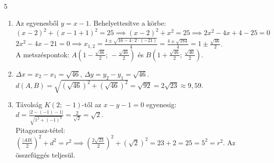 \documentclass[11pt,a4paper]{article}
\begin{document}
\begin{megoldasbox}{5}
\begin{enumerate}
  \item Az egyenesből $y = x - 1$. Behelyettesítve a körbe:\\
        $(x - 2)^2 + (x - 1 + 1)^2 = 25 \implies (x - 2)^2 + x^2 = 25 \implies 2x^2 - 4x + 4 - 25 = 0$\\
        $2x^2 - 4x - 21 = 0 \implies x_{1,2} = \frac{4 \pm \sqrt{16 - 4 \cdot 2 \cdot (-21)}}{4} = \frac{4 \pm \sqrt{184}}{4} = 1 \pm \frac{\sqrt{46}}{2}$.\\
        A metszéspontok: $A\left(1 - \frac{\sqrt{46}}{2};\, -\frac{\sqrt{46}}{2}\right)$ és $B\left(1 + \frac{\sqrt{46}}{2};\, \frac{\sqrt{46}}{2}\right)$.
  \item $\Delta x = x_2 - x_1 = \sqrt{46}$, $\Delta y = y_2 - y_1 = \sqrt{46}$.\\
        $d(A, B) = \sqrt{(\sqrt{46})^2 + (\sqrt{46})^2} = \sqrt{92} = 2\sqrt{23} \approx 9{,}59$.
  \item Távolság $K(2;\, -1)$-től az $x - y - 1 = 0$ egyenesig:\\
        $d = \frac{|2 - (-1) - 1|}{\sqrt{1^2 + (-1)^2}} = \frac{2}{\sqrt{2}} = \sqrt{2}$.\\
        Pitagorasz-tétel: $\left(\frac{|AB|}{2}\right)^2 + d^2 = r^2 \implies \left(\frac{2\sqrt{23}}{2}\right)^2 + (\sqrt{2})^2 = 23 + 2 = 25 = 5^2 = r^2$. Az összefüggés teljesül.
\end{enumerate}
\end{megoldasbox}
\end{document}
